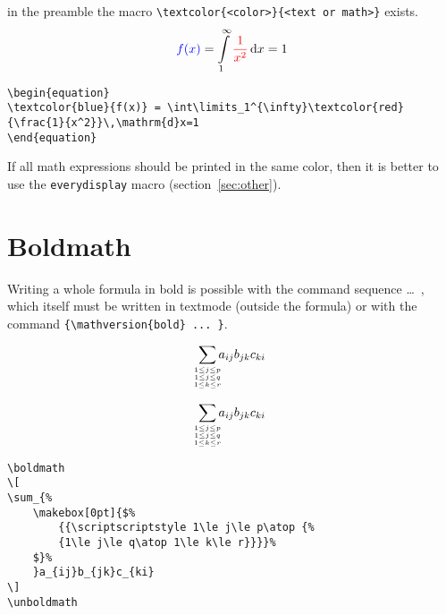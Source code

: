 \begin{table}[htb]
\noindent in the preamble the macro \verb|\textcolor{<color>}{<text or math>}| exists.
\begin{equation}
\textcolor{blue}{f(x)} = \int\limits_1^{\infty}\textcolor{red}{\frac{1}{x^2}}\,\mathrm{d}x=1
\end{equation}
\begin{lstlisting}
\begin{equation}
\textcolor{blue}{f(x)} = \int\limits_1^{\infty}\textcolor{red}{\frac{1}{x^2}}\,\mathrm{d}x=1
\end{equation}
\end{lstlisting}

If all math expressions should be printed in the same color, then it is better
to use the \verb+everydisplay+ macro (section~\vref{sec:other}).


\section{Boldmath}\label{sec:boldmath}

%
Writing a whole formula in bold is possible with the command sequence
 \ldots\ , which itself must be written in textmode (outside the
formula) or with the command \verb+{\mathversion{bold} ... }+.

\noindent\begin{minipage}{0.49\linewidth}
\[
\sum_{%
	\makebox[0pt]{$%
		{{\scriptscriptstyle 1\le j\le p\atop {%
		{1\le j\le q\atop 1\le k\le r}}}}%
	$}%
	}a_{ij}b_{jk}c_{ki}
\]
\end{minipage}\hfill
\begin{minipage}{0.49\linewidth}
\boldmath
\[
\sum_{%
	\makebox[0pt]{$%
		{{\scriptscriptstyle 1\le j\le p\atop {%
		{1\le j\le q\atop 1\le k\le r}}}}%
	$}%
	}a_{ij}b_{jk}c_{ki}
\]
\unboldmath
\end{minipage}

\medskip
\begin{lstlisting}
\boldmath
\[
\sum_{%
	\makebox[0pt]{$%
		{{\scriptscriptstyle 1\le j\le p\atop {%
		{1\le j\le q\atop 1\le k\le r}}}}%
	$}%
	}a_{ij}b_{jk}c_{ki}
\]
\unboldmath
\end{lstlisting}


\end{table}
